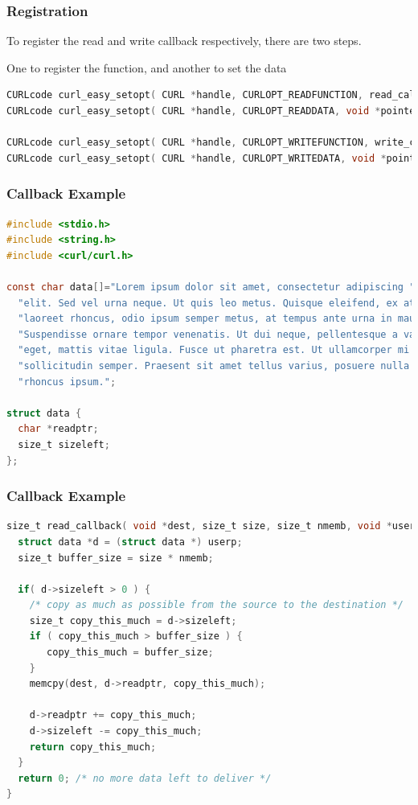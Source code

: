 \begin{frame}[fragile]
	\frametitle{Registration}

	To register the read and write callback respectively, there are two steps.

	One to register the function, and another to set the data

	\begin{lstlisting}[language=C]
CURLcode curl_easy_setopt( CURL *handle, CURLOPT_READFUNCTION, read_callback );
CURLcode curl_easy_setopt( CURL *handle, CURLOPT_READDATA, void *pointer );

CURLcode curl_easy_setopt( CURL *handle, CURLOPT_WRITEFUNCTION, write_callback );
CURLcode curl_easy_setopt( CURL *handle, CURLOPT_WRITEDATA, void *pointer );
\end{lstlisting}

\end{frame}




\begin{frame}[fragile]
	\frametitle{Callback Example}

	\begin{lstlisting}[language=C]
#include <stdio.h>
#include <string.h>
#include <curl/curl.h>
  
const char data[]="Lorem ipsum dolor sit amet, consectetur adipiscing "
  "elit. Sed vel urna neque. Ut quis leo metus. Quisque eleifend, ex at "
  "laoreet rhoncus, odio ipsum semper metus, at tempus ante urna in mauris. "
  "Suspendisse ornare tempor venenatis. Ut dui neque, pellentesque a varius "
  "eget, mattis vitae ligula. Fusce ut pharetra est. Ut ullamcorper mi ac "
  "sollicitudin semper. Praesent sit amet tellus varius, posuere nulla non, "
  "rhoncus ipsum.";
 
struct data {
  char *readptr;
  size_t sizeleft;
};
\end{lstlisting}
\end{frame}

\begin{frame}[fragile]
	\frametitle{Callback Example}

	\begin{lstlisting}[language=C]
size_t read_callback( void *dest, size_t size, size_t nmemb, void *userp ) {
  struct data *d = (struct data *) userp;
  size_t buffer_size = size * nmemb;
 
  if( d->sizeleft > 0 ) {
    /* copy as much as possible from the source to the destination */ 
    size_t copy_this_much = d->sizeleft;
    if ( copy_this_much > buffer_size ) {
       copy_this_much = buffer_size;
    }
    memcpy(dest, d->readptr, copy_this_much);
 
    d->readptr += copy_this_much;
    d->sizeleft -= copy_this_much;
    return copy_this_much; 
  }
  return 0; /* no more data left to deliver */ 
}
\end{lstlisting}

\end{frame}



